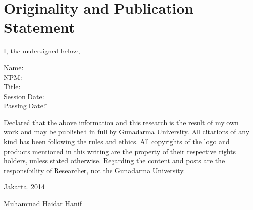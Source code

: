 
\begingroup
\let\clearpage\relax
\let\cleardoublepage\relax

\chapter{Originality and Publication Statement}
\label{chap:sig-statement}

I, the undersigned below,

\begin{tabbing}
Name: \= \myName \\
NPM: \= \myNPM \\
Title: \= \myDepTitle \\
Session Date: \= \myDateSession \\
Passing Date: \= \myDatePassing
\end{tabbing}

Declared that the above information and this research is the result of my own work and may be published in full by Gunadarma University. All citations of any kind has been following the rules and ethics. All copyrights of the logo and products mentioned in this writing are the property of their respective rights holders, unless stated otherwise. Regarding the content and posts are the responsibility of Researcher, not the Gunadarma University.

Jakarta, 2014

Muhammad Haidar Hanif

\endgroup

